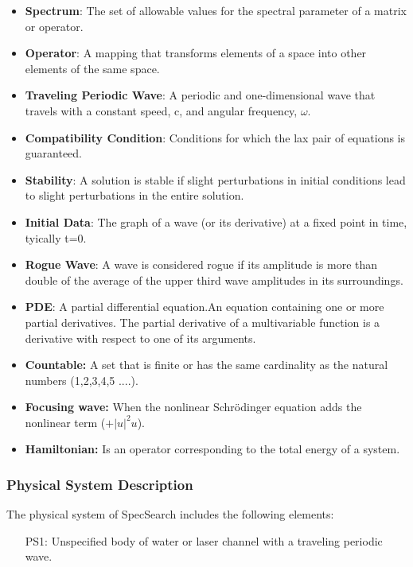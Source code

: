 \documentclass[12pt]{article}
\begin{document}
\begin{itemize}

\item \textbf{Spectrum}: The set of allowable values for the spectral parameter 
of a matrix or operator.
\item \textbf{Operator}: A mapping that transforms elements of a space into 
other elements of the same space. 
\item \textbf{Traveling Periodic Wave}: A periodic and one-dimensional wave 
that travels with a constant speed, c, and angular frequency, $\omega$. 
\item \textbf{Compatibility Condition}: Conditions for which the lax pair of 
equations is guaranteed. 
\item \textbf{Stability}: A solution is stable if slight perturbations in 
initial conditions lead 
to slight perturbations in the entire solution.
\item \textbf{Initial Data}: The graph of a wave (or its derivative) 
at a fixed point in time, tyically t=0.
\item \textbf{Rogue Wave}: A wave is considered rogue if its amplitude is more 
than double of the average of the upper third wave amplitudes in its 
surroundings. 
\item \textbf{PDE}: A partial differential equation.An equation containing one 
or more partial derivatives. The partial derivative of a multivariable function 
is a derivative with respect to one of its arguments. 
\item \textbf{Countable:} A set that is finite or has the same cardinality as 
the natural numbers (1,2,3,4,5 ....). 
\item \textbf{Focusing wave:} When the nonlinear Schr\"{o}dinger equation adds 
the 
nonlinear term ($+|u|^{2}u$).  
\item \textbf{Hamiltonian:} Is an operator corresponding to the total energy of 
a system. 

\end{itemize}

\subsubsection{Physical System Description}

The physical system of SpecSearch includes the following elements:

\begin{itemize}

\item[PS1:] 
Unspecified body of water or laser channel with a traveling periodic 
wave.

\end{itemize}
\end{document}
